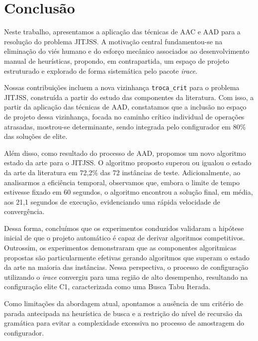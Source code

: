 \chapter{Conclusão} \label{chapt:conclusao}

Neste trabalho, apresentamos a aplicação das técnicas de \ac{AAC} e \ac{AAD} para a resolução do problema \ac{JITJSS}. A motivação central fundamentou-se na eliminação do viés humano e do esforço mecânico associados ao desenvolvimento manual de heurísticas, propondo, em contrapartida, um espaço de projeto estruturado e explorado de forma sistemática pelo pacote \textit{irace}.

Nossas contribuições incluem a nova vizinhança \texttt{troca\_crit} para o problema \ac{JITJSS}, construída a partir do estudo das componentes da literatura. Com isso, a partir da aplicação das técnicas de \ac{AAD}, constatamos que a inclusão no espaço de projeto dessa vizinhança, focada no caminho crítico individual de operações atrasadas, mostrou-se determinante, sendo integrada pelo configurador em 80\% das soluções de elite.

Além disso, como resultado do processo de \ac{AAD}, propomos um novo algoritmo estado da arte para o \ac{JITJSS}. O algoritmo proposto superou ou igualou o estado da arte da literatura em 72,2\% das 72 instâncias de teste. Adicionalmente, ao analisarmos a eficiência temporal, observamos que, embora o limite de tempo estivesse fixado em 60 segundos, o algoritmo encontrou a solução final, em média, aos 21,1 segundos de execução, evidenciando uma rápida velocidade de convergência.

Dessa forma, concluímos que os experimentos conduzidos validaram a hipótese inicial de que o projeto automático é capaz de derivar algoritmos competitivos. Outrossim, os experimentos demonstraram que as componentes algoritmicas propostas são particularmente efetivas gerando algoritmos que superam o estado da arte na maioria das instâncias. Nessa perspectiva, o processo de configuração utilizando o \textit{irace} convergiu para uma região de alto desempenho, resultando na configuração elite C1, caracterizada como uma Busca Tabu Iterada. 

Como limitações da abordagem atual, apontamos a ausência de um critério de parada antecipada na heurística de busca e a restrição do nível de recursão da gramática para evitar a complexidade excessiva no processo de amostragem do configurador.

